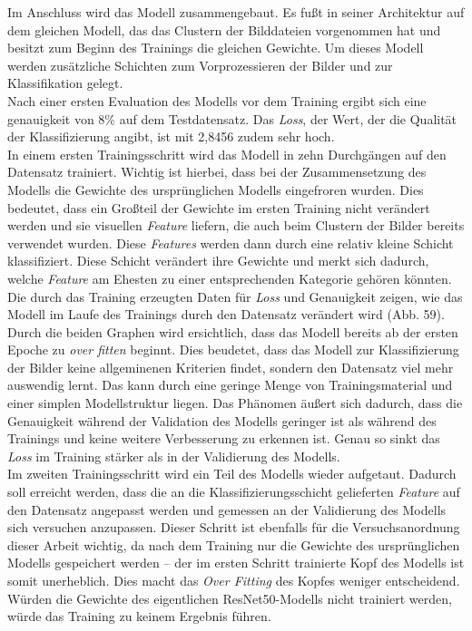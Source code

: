 \documentclass[a4paper,12pt,ngerman]{article}
\begin{document}
Im Anschluss wird das Modell zusammengebaut. Es fußt in seiner Architektur auf dem gleichen Modell, das das Clustern der Bilddateien vorgenommen hat und besitzt zum Beginn des Trainings die gleichen Gewichte. Um dieses Modell werden zusätzliche Schichten zum Vorprozessieren der Bilder und zur Klassifikation gelegt. \\
Nach einer ersten Evaluation des Modells vor dem Training ergibt sich eine genauigkeit von 8\% auf dem Testdatensatz. Das \textit{Loss}, der Wert, der die Qualität der Klassifizierung angibt, ist mit 2,8456 zudem sehr hoch. \\
In einem ersten Trainingsschritt wird das Modell in zehn Durchgängen auf den Datensatz trainiert. Wichtig ist hierbei, dass bei der Zusammensetzung des Modells die Gewichte des ursprünglichen Modells eingefroren wurden. Dies bedeutet, dass ein Großteil der Gewichte im ersten Training nicht verändert werden und sie visuellen \textit{Feature} liefern, die auch beim Clustern der Bilder bereits verwendet wurden. Diese \textit{Features} werden dann durch eine relativ kleine Schicht klassifiziert. Diese Schicht verändert ihre Gewichte und merkt sich dadurch, welche \textit{Feature} am Ehesten zu einer entsprechenden Kategorie gehören könnten. \\
Die durch das Training erzeugten Daten für \textit{Loss} und Genauigkeit zeigen, wie das Modell im Laufe des Trainings durch den Datensatz verändert wird (Abb. 59).  Durch die beiden Graphen wird ersichtlich, dass das Modell bereits ab der ersten Epoche zu \textit{over fitten} beginnt. Dies beudetet, dass das Modell zur Klassifizierung der Bilder keine allgeminenen Kriterien findet, sondern den Datensatz viel mehr auswendig lernt. Das kann durch eine geringe Menge von Trainingsmaterial und einer simplen Modellstruktur liegen. Das Phänomen äußert sich dadurch, dass die Genauigkeit während der Validation des Modells geringer ist als während des Trainings und keine weitere Verbesserung zu erkennen ist. Genau so sinkt das \textit{Loss} im Training stärker als in der Validierung des Modells. \\
Im zweiten Trainingsschritt wird ein Teil des Modells wieder aufgetaut. Dadurch soll erreicht werden, dass die an die Klassifizierungsschicht gelieferten \textit{Feature} auf den Datensatz angepasst werden und gemessen an der Validierung des Modells sich versuchen anzupassen. Dieser Schritt ist ebenfalls für die Versuchsanordnung dieser Arbeit wichtig, da nach dem Training nur die Gewichte des ursprünglichen Modells gespeichert werden -- der im ersten Schritt trainierte Kopf des Modells ist somit unerheblich. Dies macht das \textit{Over Fitting} des Kopfes weniger entscheidend. Würden die Gewichte des eigentlichen ResNet50-Modells nicht trainiert werden, würde das Training zu keinem Ergebnis führen. \\
\end{document}
